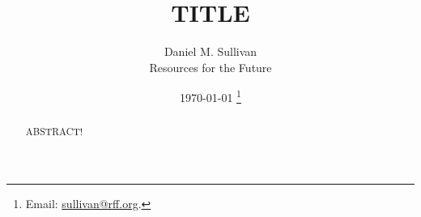 \documentclass[12pt]{article}
\title{TITLE}
\author{Daniel M. Sullivan\\Resources for the Future}
\date{\today%
    \thanks{%
        Email: \url{sullivan@rff.org}.
    }%
}
\makeatletter
\newcommand\iraggedright{%
  \let\\\@centercr\@rightskip\@flushglue \rightskip\@rightskip
  \leftskip\z@skip}
\makeatother
\begin{document}
\maketitle

\begin{abstract}\noindent
    ABSTRACT!
\end{abstract}

\clearpage
\iraggedright
\onehalfspacing
\end{document}
